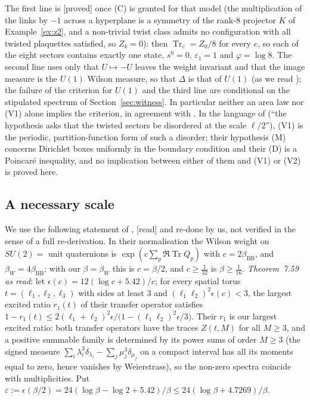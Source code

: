 \documentclass[11pt,a4paper]{article}
\theoremstyle{plain}
\theoremstyle{definition}
\theoremstyle{remark}
\numberwithin{equation}{section}
\newcommand{\Tr}{\operatorname{Tr}}
\newcommand{\st}[1]{\textsf{[#1]}}
\begin{document}
The first line is \st{proved} once (C) is granted for that model (the multiplication of the links by $-1$ across a hyperplane is a symmetry of the rank-$8$ projector $K$ of Example~\ref{ex:z2}, and a non-trivial twist class admits no configuration with all twisted plaquettes satisfied, so $Z_k=0$): then $\Tr_e=Z_0/8$ for every $e$, so each of the eight sectors contains exactly one state, $s^0=0$, $\varepsilon_1=1$ and $\varphi=\log8$. The second line uses only that $U\mapsto-U$ leaves the weight invariant and that the image measure is the $U(1)$ Wilson measure, so that $\Delta$ is that of $U(1)$ (as we read \cite[Prop.~11.29]{BB26v5}); the failure of the criterion for $U(1)$ and the third line are conditional on the stipulated spectrum of Section~\ref{sec:witness}. In particular neither an area law nor (V1) alone implies the criterion, in agreement with \cite[Prop.~11.29]{BB26v5}. In the language of \cite[l.~6681--6686]{BB26v5} (``the hypothesis asks that the twisted sectors be disordered at the scale $\ell/2$''), (V1) is the periodic, partition-function form of such a disorder; their hypothesis (M) concerns Dirichlet boxes uniformly in the boundary condition and their (D) is a Poincar\'e inequality, and no implication between either of them and (V1) or (V2) is proved here.

\subsection{A necessary scale}\label{subsec:T5}
We use the following statement of \cite{BB26v5}, \st{read} and re-done by us, not verified in the sense of a full re-derivation. In their normalisation the Wilson weight on $SU(2)=$ unit quaternions is $\exp(c\sum_p\Re\Tr Q_p)$ with $c=2\beta_{\mathrm{BB}}$, and $\beta_W=4\beta_{\mathrm{BB}}$; with our $\beta=\beta_W$ this is $c=\beta/2$, and $c\ge\frac1{32}$ is $\beta\ge\frac1{16}$. \emph{Theorem~7.59 as read}: let $\epsilon(c)=12(\log c+5.42)/c$; for every spatial torus $t=(\ell_1,\ell_2,\ell_3)$ with sides at least $3$ and $(\ell_1\ell_2)^2\epsilon(c)<3$, the largest excited ratio $r_1(t)$ of their transfer operator satisfies $1-r_1(t)\le2(\ell_1+\ell_2)^2\epsilon/\bigl(1-(\ell_1\ell_2)^2\epsilon/3\bigr)$. Their $r_1$ is our largest excited ratio: both transfer operators have the traces $Z(t,M)$ for all $M\ge3$, and a positive summable family is determined by its power sums of order $M\ge3$ (the signed measure $\sum_i\lambda_i^3\delta_{\lambda_i}-\sum_j\mu_j^3\delta_{\mu_j}$ on a compact interval has all its moments equal to zero, hence vanishes by Weierstrass), so the non-zero spectra coincide with multiplicities. Put $\varepsilon:=\epsilon(\beta/2)=24(\log\beta-\log2+5.42)/\beta\le24(\log\beta+4.7269)/\beta$.
\end{document}
